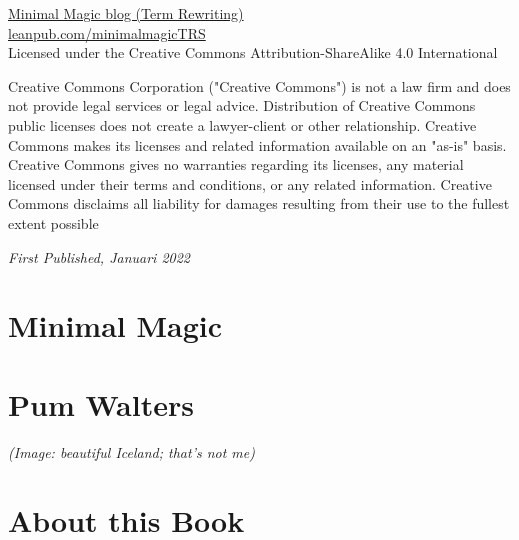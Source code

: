	\noindent \href{https://www.minimalmagic.blog/trs/termrewriting/}{Minimal Magic blog (Term Rewriting)}\\ %

	\noindent \href{https://leanpub.com/minimalmagicTRS}{leanpub.com/minimalmagicTRS}\\ %

	\noindent Licensed under the Creative Commons Attribution-ShareAlike 4.0 International

Creative Commons Corporation ("Creative Commons") is not a law firm and does not provide legal services or legal advice. Distribution of Creative Commons public licenses does not create a lawyer-client or other relationship. Creative Commons makes its licenses and related information available on an "as-is" basis. Creative Commons gives no warranties regarding its licenses, any material licensed under their terms and conditions, or any related information. Creative Commons disclaims all liability for damages resulting from their use to the fullest extent possible

	\noindent \textit{First Published, Januari 2022} %






\chapter{Minimal Magic}


\chapter{Pum Walters}


{\it (Image: beautiful Iceland; that's not me)}

\chapter{About this Book}


